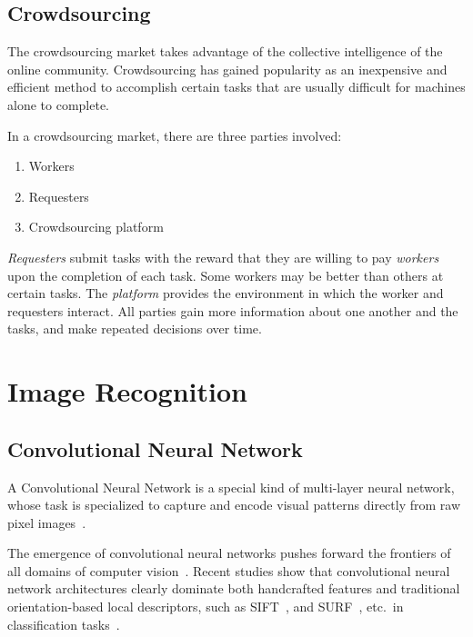   \subsection{Crowdsourcing}

  The crowdsourcing market takes advantage of the collective intelligence
  of the online community. Crowdsourcing has gained popularity as an inexpensive
  and efficient method to accomplish certain tasks that are usually difficult for
  machines alone to complete.

  In a crowdsourcing market, there are three parties involved:
  \begin{enumerate}
  	\item Workers
  	\item Requesters
  	\item Crowdsourcing platform
  \end{enumerate}

  \emph{Requesters} submit tasks with the reward that they are
  willing to pay \emph{workers} upon the completion of each task. Some workers
  may be better than others at certain tasks. The \emph{platform} provides the
  environment in which the worker and requesters interact. All parties gain more
  information about one another and the tasks, and make repeated decisions
  over time.


\section{Image Recognition}

  \subsection{Convolutional Neural Network}

  A Convolutional Neural Network is a special kind of multi-layer neural network,
  whose task is specialized to capture and encode visual patterns directly from
  raw pixel images~\cite{lecun95}.

  The emergence of convolutional neural networks pushes forward the frontiers of all
  domains of computer vision~\cite{lecun95}. Recent studies show that
  convolutional neural network architectures clearly dominate both handcrafted
  features and traditional orientation-based local descriptors, such as
  SIFT~\cite{lowe04}, and SURF~\cite{surf08}, etc.\ in classification
  tasks~\cite{fisher14,kriz12,prelu15,ILSVRC15}.


